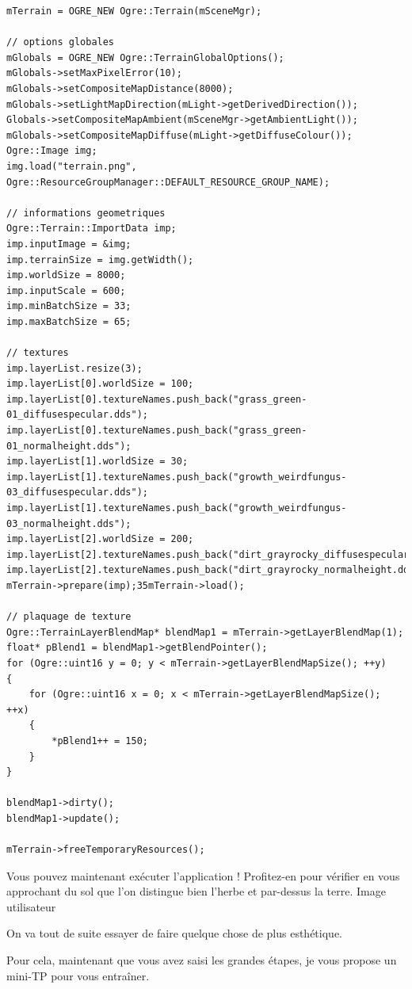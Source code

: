 \begin{lstlisting}[caption={createTerrain (code complet)}]
mTerrain = OGRE_NEW Ogre::Terrain(mSceneMgr);

// options globales
mGlobals = OGRE_NEW Ogre::TerrainGlobalOptions();
mGlobals->setMaxPixelError(10);
mGlobals->setCompositeMapDistance(8000);
mGlobals->setLightMapDirection(mLight->getDerivedDirection());
Globals->setCompositeMapAmbient(mSceneMgr->getAmbientLight());
mGlobals->setCompositeMapDiffuse(mLight->getDiffuseColour());
Ogre::Image img;
img.load("terrain.png", Ogre::ResourceGroupManager::DEFAULT_RESOURCE_GROUP_NAME);

// informations geometriques
Ogre::Terrain::ImportData imp;
imp.inputImage = &img;
imp.terrainSize = img.getWidth();
imp.worldSize = 8000;
imp.inputScale = 600;
imp.minBatchSize = 33;
imp.maxBatchSize = 65;

// textures
imp.layerList.resize(3);
imp.layerList[0].worldSize = 100;
imp.layerList[0].textureNames.push_back("grass_green-01_diffusespecular.dds");
imp.layerList[0].textureNames.push_back("grass_green-01_normalheight.dds");
imp.layerList[1].worldSize = 30;
imp.layerList[1].textureNames.push_back("growth_weirdfungus-03_diffusespecular.dds");
imp.layerList[1].textureNames.push_back("growth_weirdfungus-03_normalheight.dds");
imp.layerList[2].worldSize = 200;
imp.layerList[2].textureNames.push_back("dirt_grayrocky_diffusespecular.dds");
imp.layerList[2].textureNames.push_back("dirt_grayrocky_normalheight.dds");
mTerrain->prepare(imp);35mTerrain->load();

// plaquage de texture
Ogre::TerrainLayerBlendMap* blendMap1 = mTerrain->getLayerBlendMap(1);
float* pBlend1 = blendMap1->getBlendPointer();
for (Ogre::uint16 y = 0; y < mTerrain->getLayerBlendMapSize(); ++y)
{
    for (Ogre::uint16 x = 0; x < mTerrain->getLayerBlendMapSize(); ++x)
    {
        *pBlend1++ = 150;
    }
}

blendMap1->dirty();
blendMap1->update();

mTerrain->freeTemporaryResources();
\end{lstlisting}

Vous pouvez maintenant exécuter l'application ! Profitez-en pour vérifier en vous approchant du sol que l'on distingue bien l'herbe et par-dessus la terre.
Image utilisateur

On va tout de suite essayer de faire quelque chose de plus esthétique.

Pour cela, maintenant que vous avez saisi les grandes étapes, je vous propose un mini-TP pour vous entraîner.









